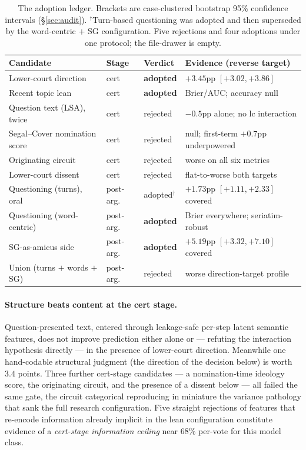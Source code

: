 \documentclass[11pt]{article}
\begin{document}
\begin{table}[t]
\centering
\small
\begin{tabular}{llll}
\toprule
Candidate & Stage & Verdict & Evidence (reverse target) \\
\midrule
Lower-court direction & cert & \textbf{adopted} & $+3.45$pp $[+3.02, +3.86]$ \\
Recent topic lean & cert & \textbf{adopted} & Brier/AUC; accuracy null \\
Question text (LSA), twice & cert & rejected & $-0.5$pp alone; no lc interaction \\
Segal--Cover nomination score & cert & rejected & null; first-term $+0.7$pp underpowered \\
Originating circuit & cert & rejected & worse on all six metrics \\
Lower-court dissent & cert & rejected & flat-to-worse both targets \\
Questioning (turns), oral & post-arg. & adopted$^{\dagger}$ & $+1.73$pp $[+1.11, +2.33]$ covered \\
Questioning (word-centric) & post-arg. & \textbf{adopted} & Brier everywhere; seriatim-robust \\
SG-as-amicus side & post-arg. & \textbf{adopted} & $+5.19$pp $[+3.32, +7.10]$ covered \\
Union (turns $+$ words $+$ SG) & post-arg. & rejected & worse direction-target profile \\
\bottomrule
\end{tabular}
\caption{The adoption ledger. Brackets are case-clustered bootstrap 95\%
confidence intervals (\S\ref{sec:audit}). $^{\dagger}$Turn-based questioning
was adopted and then superseded by the word-centric $+$ SG configuration.
Five rejections and four adoptions under one protocol; the file-drawer is
empty.}
\label{tab:ledger}
\end{table}

\paragraph{Structure beats content at the cert stage.} Question-presented text,
entered through leakage-safe per-step latent semantic features, does not improve
prediction either alone or --- refuting the interaction hypothesis directly ---
in the presence of lower-court direction. Meanwhile one hand-codable structural
judgment (the direction of the decision below) is worth $3.4$ points. Three
further cert-stage candidates --- a nomination-time ideology score, the
originating circuit, and the presence of a dissent below --- all failed the
same gate, the circuit categorical reproducing in miniature the variance
pathology that sank the full research configuration. Five straight rejections
of features that re-encode information already implicit in the lean
configuration constitute evidence of a \emph{cert-stage information ceiling}
near 68\% per-vote for this model class.
\end{document}

